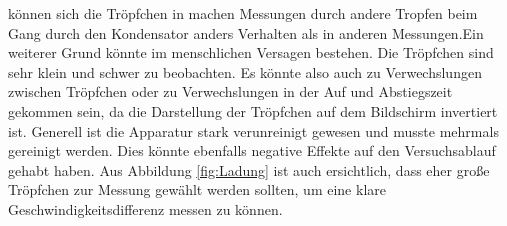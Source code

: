 können sich die Tröpfchen in machen Messungen durch andere Tropfen beim Gang durch den Kondensator anders Verhalten als in anderen Messungen.Ein weiterer Grund könnte im menschlichen Versagen bestehen. Die Tröpfchen sind sehr klein und schwer zu beobachten.
Es könnte also auch zu Verwechslungen zwischen Tröpfchen oder zu Verwechslungen in der Auf und Abstiegszeit gekommen sein, da die Darstellung der
Tröpfchen auf dem Bildschirm invertiert ist. Generell ist die Apparatur stark verunreinigt gewesen und musste mehrmals gereinigt werden. Dies könnte ebenfalls
negative Effekte auf den Versuchsablauf gehabt haben. Aus Abbildung \ref{fig:Ladung} ist auch ersichtlich, dass eher große Tröpfchen
zur Messung gewählt werden sollten, um eine klare Geschwindigkeitsdifferenz messen zu können.
\label{sec:Diskussion}
